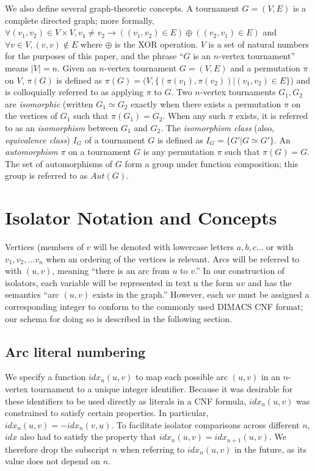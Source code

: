 \documentclass[conference]{IEEEtran}
\begin{document}
We also define several graph-theoretic concepts.
A tournament $G = (V,E)$ is a complete directed graph; more formally, $\forall (v_1, v_2) \in V \times V, v_1 \neq v_2 \rightarrow ((v_1, v_2) \in E) \oplus ((v_2, v_1) \in E)$ and $\forall v \in V, (v,v) \notin E$ where $\oplus$ is the XOR operation. $V$ is a set of natural numbers for the purposes of this paper, and the phrase ``$G$ is an $n$-vertex tournament'' means $|V| = n$.
Given an $n$-vertex tournament $G= (V,E)$ and a permutation $\pi$ on $V$, $\pi(G)$ is defined as $\pi(G) = (V, \{(\pi(v_1), \pi(v_2)) | (v_1, v_2) \in E\}$) and is colloquially referred to as applying $\pi$ to $G$.
Two $n$-vertex tournaments $G_1, G_2$ are \emph{isomorphic} (written $G_1 \simeq G_2$ exactly when there exists a permutation $\pi$ on the vertices of $G_1$ such that $\pi(G_1) = G_2$. When any such $\pi$ exists, it is referred to as an \emph{isomorphism} between $G_1$ and $G_2$.
The \emph{isomorphism class} (also, \emph{equivalence class}) $I_G$ of a tournament $G$ is defined as $I_G = \{G' | G \simeq G'\}$.
An \emph{automorphism} $\pi$ on a tournament $G$ is any permutation $\pi$ such that $\pi(G) = G$. The set of automorphisms of $G$ form a group under function composition; this group is referred to as $Aut(G)$.

\section{Isolator Notation and Concepts}

Vertices (members of $v$ will be denoted with lowercase letters $a,b,c...$ or with $v_1, v_2, ... v_n$ when an ordering of the vertices is relevant. Arcs will be referred to with $(u,v)$, meaning ``there is an arc from $u$ to $v$.'' In our construction of isolators, each variable will be represented in text n the form $uv$ and has the semantics ``arc $(u,v)$ exists in the graph.'' However, each $uv$ must be assigned a corresponding integer to conform to the commonly used DIMACS CNF format; our schema for doing so is described in the following section.

\subsection{Arc literal numbering}
We specify a function $idx_n(u,v)$ to map each possible arc $(u,v)$ in an $n$-vertex tournament to a unique integer identifier. Because it was desirable for these identifiers to be used directly as literals in a CNF formula, $idx_n(u,v)$ was constrained to satisfy certain properties. In particular, $\mathit{idx}_n(u,v) = -\mathit{idx}_n(v,u)$. To facilitate isolator comparisons across different $n$, $\mathit{idx}$ also had to satisfy the property that $\mathit{idx}_n(u,v) = \mathit{idx}_{n+1}(u,v)$. We therefore drop the subscript $n$ when referring to $\mathit{idx}_n(u,v) $ in the future, as its value does not depend on $n$. 
\end{document}
